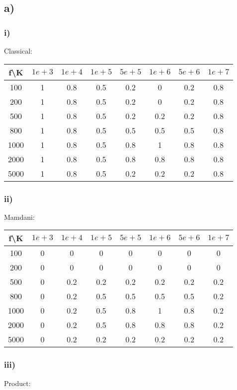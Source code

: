 \documentclass[12pt,a4paper]{article}
\begin{document}
\subsection*{a)}
\label{sub:a_}
\subsubsection*{i)}
\label{ssub:i_}
Classical:

\begin{tabular}{c | c c c c c c c}
f\textbackslash K & $1e+3$ & $1e+4$ & $1e+5$ & $5e+5$ & $1e+6$ & $5e+6$ & $1e+7$\\
\hline
100  & 1  & 0.8  & 0.5  & 0.2  & 0  & 0.2  & 0.8 \\
200  & 1  & 0.8  & 0.5  & 0.2  & 0  & 0.2  & 0.8 \\
500  & 1  & 0.8  & 0.5  & 0.2  & 0.2  & 0.2  & 0.8 \\
800  & 1  & 0.8  & 0.5  & 0.5  & 0.5  & 0.5  & 0.8 \\
1000 & 1  & 0.8  & 0.5  & 0.8  & 1  & 0.8  & 0.8 \\
2000 & 1  & 0.8  & 0.5  & 0.8  & 0.8  & 0.8  & 0.8 \\
5000 & 1  & 0.8  & 0.5  & 0.2  & 0.2  & 0.2  & 0.8 \\
\end{tabular}

\subsubsection*{ii)}
\label{ssub:ii_}
Mamdani:

\begin{tabular}{c | c c c c c c c}
f\textbackslash K & $1e+3$ & $1e+4$ & $1e+5$ & $5e+5$ & $1e+6$ & $5e+6$ & $1e+7$\\
\hline
100  & 0  & 0  & 0  & 0  & 0  & 0  & 0 \\
200  & 0  & 0  & 0  & 0  & 0  & 0  & 0 \\
500  & 0  & 0.2  & 0.2  & 0.2  & 0.2  & 0.2  & 0.2 \\
800  & 0  & 0.2  & 0.5  & 0.5  & 0.5  & 0.5  & 0.2 \\
1000 & 0  & 0.2  & 0.5  & 0.8  & 1  & 0.8  & 0.2 \\
2000 & 0  & 0.2  & 0.5  & 0.8  & 0.8  & 0.8  & 0.2 \\
5000 & 0  & 0.2  & 0.2  & 0.2  & 0.2  & 0.2  & 0.2 \\
\end{tabular}

\subsubsection*{iii)}
\label{ssub:iii_}
Product:
\end{document}
